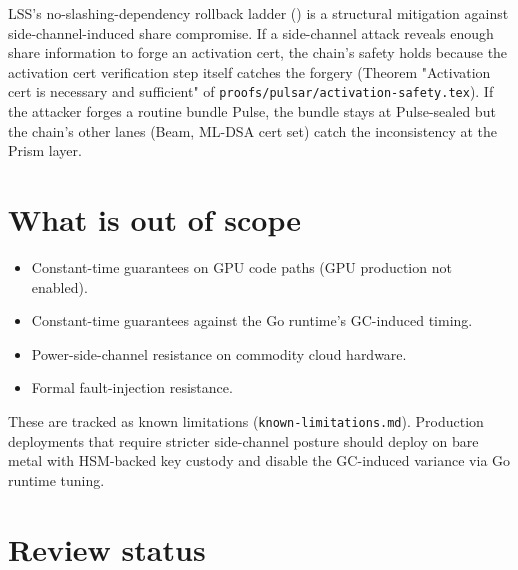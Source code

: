 \documentclass[11pt,a4paper]{article}
\begin{document}
LSS's no-slashing-dependency rollback ladder (\cite{luxlssmpc}) is a structural mitigation against side-channel-induced share compromise. If a side-channel attack reveals enough share information to forge an activation cert, the chain's safety holds because the activation cert verification step itself catches the forgery (Theorem "Activation cert is necessary and sufficient" of \texttt{proofs/pulsar/activation-safety.tex}). If the attacker forges a routine bundle Pulse, the bundle stays at Pulse-sealed but the chain's other lanes (Beam, ML-DSA cert set) catch the inconsistency at the Prism layer.

\section{What is out of scope}

\begin{itemize}[leftmargin=2em,nosep]
  \item Constant-time guarantees on GPU code paths (GPU production not enabled).
  \item Constant-time guarantees against the Go runtime's GC-induced timing.
  \item Power-side-channel resistance on commodity cloud hardware.
  \item Formal fault-injection resistance.
\end{itemize}

These are tracked as known limitations (\texttt{known-limitations.md}). Production deployments that require stricter side-channel posture should deploy on bare metal with HSM-backed key custody and disable the GC-induced variance via Go runtime tuning.

\section{Review status}
\end{document}
